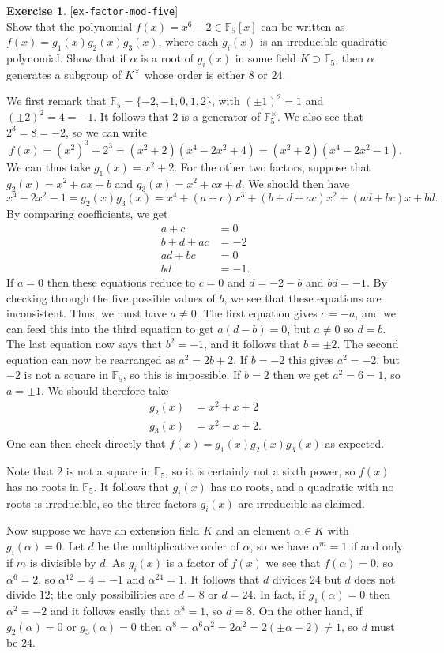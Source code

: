 \documentclass{amsart}
\newcommand{\F}         {{\mathbb{F}}}
\newcommand{\al}        {\alpha}
\newcommand{\tm}        {\times}
\renewcommand{\:}{\colon}
\newcommand{\lastexlabel}{}
\newcommand{\exlabel}[1]{
 \global\def\lastexlabel{#1}\label{#1}[\texttt{#1}]\ \\
}
\newcommand{\exlabel}[1]{
 \global\def\lastexlabel{#1}\label{#1}
}
\newenvironment{solution}{\SolutionInline}{\endSolutionInline}
\theoremstyle{definition}
\newtheorem{exercise}{Exercise}[section]
\renewenvironment{solution}{\SolutionAtEnd}{\endSolutionAtEnd}
\begin{document}
\begin{exercise}\exlabel{ex-factor-mod-five}
 Show that the polynomial $f(x)=x^6-2\in\F_5[x]$ can be written as 
 $f(x)=g_1(x)g_2(x)g_3(x)$, where each $g_i(x)$ is an irreducible
 quadratic polynomial.  Show that if $\al$ is a root of $g_i(x)$ in
 some field $K\supset\F_5$, then $\al$ generates a subgroup of $K^\tm$
 whose order is either $8$ or $24$.
\end{exercise}
\begin{solution}
 We first remark that $\F_5=\{-2,-1,0,1,2\}$, with $(\pm 1)^2=1$ and
 $(\pm 2)^2=4=-1$.  It follows that $2$ is a generator of $\F_5^\tm$.
 We also see that $2^3=8=-2$, so we can write 
 \[ f(x) = (x^2)^3 + 2^3 = (x^2+2)(x^4-2x^2+4) 
     = (x^2+2)(x^4-2x^2-1).
 \]
 We can thus take $g_1(x)=x^2+2$.  For the other two factors, suppose
 that $g_2(x)=x^2+ax+b$ and $g_3(x)=x^2+cx+d$.  We should then have 
 \[ x^4-2x^2-1 = g_2(x)g_3(x) = 
     x^4 + (a+c)x^3 + (b+d+ac) x^2 + (ad+bc)x +bd.
 \]
 By comparing coefficients, we get
 \begin{align*}
  a+c &= 0 \\
  b+d+ac &= -2 \\
  ad+bc &= 0 \\
  bd &= -1.
 \end{align*}
 If $a=0$ then these equations reduce to $c=0$ and $d=-2-b$ and
 $bd=-1$.  By checking through the five possible values of $b$, we see
 that these equations are inconsistent.  Thus, we must have
 $a\neq 0$.  The first equation gives $c=-a$, and we can feed this
 into the third equation to get $a(d-b)=0$, but $a\neq 0$ so $d=b$.
 The last equation now says that $b^2=-1$, and it follows that
 $b=\pm 2$.  The second equation can now be rearranged as $a^2=2b+2$.
 If $b=-2$ this gives $a^2=-2$, but $-2$ is not a square in $\F_5$, so
 this is impossible.  If $b=2$ then we get $a^2=6=1$, so $a=\pm 1$.
 We should therefore take 
 \begin{align*}
  g_2(x) &= x^2 + x + 2 \\
  g_3(x) &= x^2 - x + 2.
 \end{align*}
 One can then check directly that $f(x)=g_1(x)g_2(x)g_3(x)$ as
 expected.  

 Note that $2$ is not a square in $\F_5$, so it is certainly not a
 sixth power, so $f(x)$ has no roots in $\F_5$.  It follows that
 $g_i(x)$ has no roots, and a quadratic with no roots is irreducible,
 so the three factors $g_i(x)$ are irreducible as claimed.

 Now suppose we have an extension field $K$ and an element $\al\in K$
 with $g_i(\al)=0$.  Let $d$ be the multiplicative order of $\al$, so
 we have $\al^m=1$ if and only if $m$ is divisible by $d$.  As
 $g_i(x)$ is a factor of $f(x)$ we see that $f(\al)=0$, so $\al^6=2$,
 so $\al^{12}=4=-1$ and $\al^{24}=1$.  It follows that $d$ divides
 $24$ but $d$ does not divide $12$; the only possibilities are $d=8$
 or $d=24$.  In fact, if $g_1(\al)=0$ then $\al^2=-2$ and it follows
 easily that $\al^8=1$, so $d=8$.  On the other hand, if $g_2(\al)=0$
 or $g_3(\al)=0$ then $\al^8=\al^6\al^2=2\al^2=2(\pm\al-2)\neq 1$, so
 $d$ must be $24$.
\end{solution}
\end{document}
